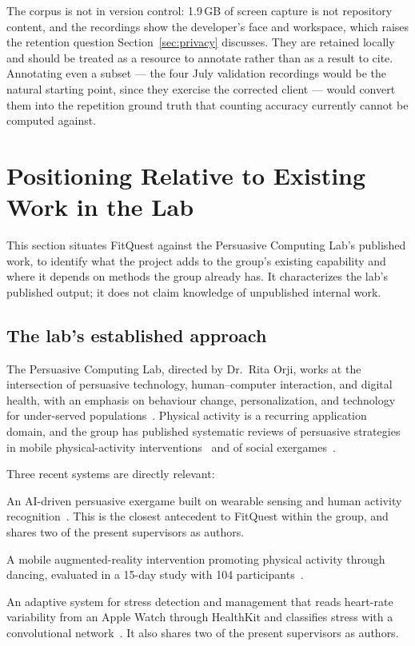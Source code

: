 \documentclass[11pt,a4paper]{article}
\begin{document}
The corpus is not in version control: 1.9\,GB of screen capture is not
repository content, and the recordings show the developer's face and workspace,
which raises the retention question Section~\ref{sec:privacy} discusses. They
are retained locally and should be treated as a resource to annotate rather than
as a result to cite. Annotating even a subset --- the four July validation
recordings would be the natural starting point, since they exercise the
corrected client --- would convert them into the repetition ground truth that
counting accuracy currently cannot be computed against.

\section{Positioning Relative to Existing Work in the Lab}
\label{sec:positioning}

This section situates FitQuest against the Persuasive Computing Lab's published
work, to identify what the project adds to the group's existing capability and
where it depends on methods the group already has. It characterizes the lab's
published output; it does not claim knowledge of unpublished internal work.

\subsection{The lab's established approach}

The Persuasive Computing Lab, directed by Dr.\ Rita Orji, works at the
intersection of persuasive technology, human--computer interaction, and digital
health, with an emphasis on behaviour change, personalization, and
technology for under-served populations~\cite{orji-bio,pcl}. Physical activity
is a recurring application domain, and the group has published systematic
reviews of persuasive strategies in mobile physical-activity
interventions~\cite{review-pa} and of social exergames~\cite{review-exergames}.

Three recent systems are directly relevant:

\begin{description}[leftmargin=1.2cm,style=nextline,itemsep=3pt]
\item[FITPULSE] An AI-driven persuasive exergame built on wearable sensing and
human activity recognition~\cite{fitpulse}. This is the closest antecedent to
FitQuest within the group, and shares two of the present supervisors as authors.
\item[AR Dancee] A mobile augmented-reality intervention promoting physical
activity through dancing, evaluated in a 15-day study with 104
participants~\cite{ardancee}.
\item[CalmMe] An adaptive system for stress detection and management that reads
heart-rate variability from an Apple Watch through HealthKit and classifies
stress with a convolutional network~\cite{calmme}. It also shares two of the
present supervisors as authors.
\end{description}
\end{document}
